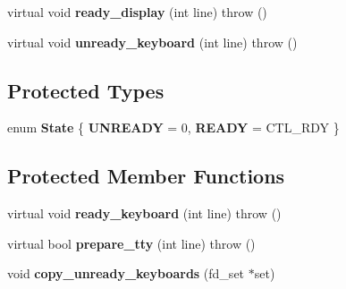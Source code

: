 \begin{DoxyCompactItemize}
\item 
\hypertarget{classTerminalController_a38a988039e7bcb29a7b6b74273d99ffa}{
virtual void {\bfseries ready\_\-display} (int line)  throw ()}
\label{classTerminalController_a38a988039e7bcb29a7b6b74273d99ffa}

\item 
\hypertarget{classTerminalController_afe5b8685b5149db2b7cc5b2e395a479e}{
virtual void {\bfseries unready\_\-keyboard} (int line)  throw ()}
\label{classTerminalController_afe5b8685b5149db2b7cc5b2e395a479e}

\end{DoxyCompactItemize}
\subsection*{Protected Types}
\begin{DoxyCompactItemize}
\item 
enum {\bfseries State} \{ {\bfseries UNREADY} =  0, 
{\bfseries READY} =  CTL\_\-RDY
 \}
\end{DoxyCompactItemize}
\subsection*{Protected Member Functions}
\begin{DoxyCompactItemize}
\item 
\hypertarget{classTerminalController_a0475271dfd2cbed03ea8c95964771b20}{
virtual void {\bfseries ready\_\-keyboard} (int line)  throw ()}
\label{classTerminalController_a0475271dfd2cbed03ea8c95964771b20}

\item 
\hypertarget{classTerminalController_a2b3bc99eae822e9fec9b54e0a3aad57a}{
virtual bool {\bfseries prepare\_\-tty} (int line)  throw ()}
\label{classTerminalController_a2b3bc99eae822e9fec9b54e0a3aad57a}

\item 
\hypertarget{classTerminalController_a43234a11dfcdbca163d940a214f11009}{
void {\bfseries copy\_\-unready\_\-keyboards} (fd\_\-set $\ast$set)}
\label{classTerminalController_a43234a11dfcdbca163d940a214f11009}

\end{DoxyCompactItemize}

